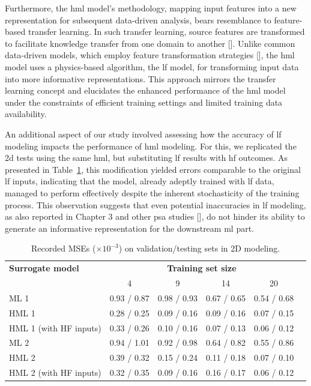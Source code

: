 \documentclass[12pt,a4paper]{report}
\begin{document}
Furthermore, the \ac{hml} model's methodology, mapping input features into a new representation for subsequent data-driven analysis, bears resemblance to feature-based transfer learning. In such transfer learning, source features are transformed to facilitate knowledge transfer from one domain to another [\cite{zhuang2021}]. Unlike common data-driven models, which employ feature transformation strategies [\cite{pan2011,dai2007,prague2007}], the \ac{hml} model uses a physics-based algorithm, the \ac{lf} model, for transforming input data into more informative representations. This approach mirrors the transfer learning concept and elucidates the enhanced performance of the \ac{hml} model under the constraints of efficient training settings and limited training data availability.

An additional aspect of our study involved assessing how the accuracy of \ac{lf} modeling impacts the performance of \ac{hml} modeling. For this, we replicated the \ac{2d} tests using the same \ac{hml}, but substituting \ac{lf} results with \ac{hf} outcomes. As presented in Table~\ref{table:2d}, this modification yielded errors comparable to the original \ac{lf} inputs, indicating that the model, already adeptly trained with \ac{lf} data, managed to perform effectively despite the inherent stochasticity of the training process. This observation suggests that even potential inaccuracies in \ac{lf} modeling, as also reported in Chapter 3 and other \ac{psa} studies [\cite{bols2013,wang2018}], do not hinder its ability to generate an informative representation for the downstream \ac{ml} part.
%
\begin{table}[b]
\centering
\caption{Recorded MSEs ($\times 10^{-3}$) on validation/testing sets in 2D modeling.}
\begin{tabular}{lccccc}
\toprule
\textbf{Surrogate model} & \multicolumn{4}{c}{\textbf{Training set size}} \\\cmidrule{2-5}
 &    4 &   9 &   14 &    20 \\
\midrule
ML 1 &                     0.93 / 0.87 &  0.98 / 0.93 &  0.67 / 0.65 &  0.54 / 0.68 \\
HML 1 &                               0.28 / 0.25 &  0.09 / 0.16 &  0.09 / 0.16 &  0.07 / 0.15 \\
HML 1 (with HF inputs) &   0.33 / 0.26 &  0.10 / 0.16 &  0.07 / 0.13 &  0.06 / 0.12 \\
ML 2 &                     0.94 / 1.01 & 0.92 / 0.98 &  0.64 / 0.82 &  0.55 / 0.86 \\      
HML 2 &                               0.39 / 0.32 &  0.15 / 0.24 &  0.11 / 0.18 &  0.07 / 0.10 \\      
HML 2 (with HF inputs) &   0.32 / 0.35 &  0.09 / 0.16 &  0.16 / 0.17 &  0.06 / 0.12 \\      
\bottomrule
\end{tabular}
\label{table:2d}
\end{table}
\end{document}
